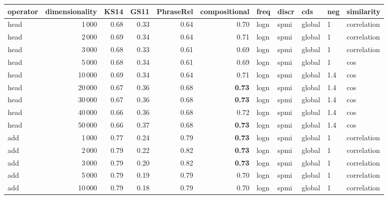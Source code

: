 \begin{tabular}{lrrrrrlllll}
\toprule
operator &  dimensionality &  KS14 &  GS11 &  PhraseRel &  compositional &  freq &  discr &     cds &  neg &     similarity \\
\midrule
    head &            1\,000 &  0.68 &  0.33 &       0.64 &           0.70 &  logn &   spmi &  global &    1 &    correlation \\
    head &            2\,000 &  0.69 &  0.34 &       0.64 &           0.71 &  logn &   spmi &  global &    1 &    correlation \\
    head &            3\,000 &  0.68 &  0.33 &       0.61 &           0.69 &  logn &   spmi &  global &    1 &    correlation \\
    head &            5\,000 &  0.68 &  0.34 &       0.61 &           0.69 &  logn &   spmi &  global &    1 &            cos \\
    head &           10\,000 &  0.69 &  0.34 &       0.64 &           0.71 &  logn &   spmi &  global &  1.4 &            cos \\
    head &           20\,000 &  0.67 &  0.36 &       0.68 &           \textbf{0.73} &  logn &   spmi &  global &  1.4 &            cos \\
    head &           30\,000 &  0.67 &  0.36 &       0.68 &           \textbf{0.73} &  logn &   spmi &  global &  1.4 &            cos \\
    head &           40\,000 &  0.66 &  0.36 &       0.68 &           0.72 &  logn &   spmi &  global &  1.4 &            cos \\
    head &           50\,000 &  0.66 &  0.37 &       0.68 &           \textbf{0.73} &  logn &   spmi &  global &  1.4 &            cos \\ \addlinespace
     add &            1\,000 &  0.77 &  0.24 &       0.79 &           \textbf{0.73} &  logn &   spmi &  global &    1 &    correlation \\
     add &            2\,000 &  0.79 &  0.22 &       0.82 &           \textbf{0.73} &  logn &   spmi &  global &    1 &    correlation \\
     add &            3\,000 &  0.79 &  0.20 &       0.82 &           \textbf{0.73} &  logn &   spmi &  global &    1 &    correlation \\
     add &            5\,000 &  0.79 &  0.19 &       0.79 &           0.70 &  logn &   spmi &  global &    1 &    correlation \\
     add &           10\,000 &  0.79 &  0.18 &       0.79 &           0.70 &  logn &   spmi &  global &    1 &    correlation \\

\end{tabular}
